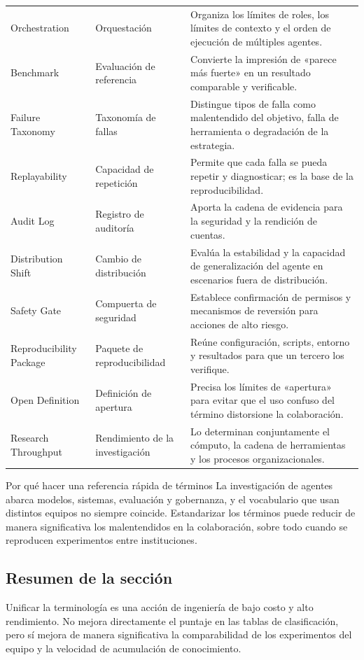 \documentclass[a4paper]{article}
\begin{document}
\begin{longtable}{p{2.7cm}p{3.2cm}p{5.6cm}}
Orchestration & Orquestación & Organiza los límites de roles, los límites de contexto y el orden de ejecución de múltiples agentes. \\
Benchmark & Evaluación de referencia & Convierte la impresión de «parece más fuerte» en un resultado comparable y verificable. \\
Failure Taxonomy & Taxonomía de fallas & Distingue tipos de falla como malentendido del objetivo, falla de herramienta o degradación de la estrategia. \\
Replayability & Capacidad de repetición & Permite que cada falla se pueda repetir y diagnosticar; es la base de la reproducibilidad. \\
Audit Log & Registro de auditoría & Aporta la cadena de evidencia para la seguridad y la rendición de cuentas. \\
Distribution Shift & Cambio de distribución & Evalúa la estabilidad y la capacidad de generalización del agente en escenarios fuera de distribución. \\
Safety Gate & Compuerta de seguridad & Establece confirmación de permisos y mecanismos de reversión para acciones de alto riesgo. \\
Reproducibility Package & Paquete de reproducibilidad & Reúne configuración, scripts, entorno y resultados para que un tercero los verifique. \\
Open Definition & Definición de apertura & Precisa los límites de «apertura» para evitar que el uso confuso del término distorsione la colaboración. \\
Research Throughput & Rendimiento de la investigación & Lo determinan conjuntamente el cómputo, la cadena de herramientas y los procesos organizacionales. \\
\bottomrule
\end{longtable}

\begin{knowledgebox}{Por qué hacer una referencia rápida de términos}
La investigación de agentes abarca modelos, sistemas, evaluación y gobernanza, y el vocabulario que usan distintos equipos no siempre coincide.
Estandarizar los términos puede reducir de manera significativa los malentendidos en la colaboración, sobre todo cuando se reproducen experimentos entre instituciones.
\end{knowledgebox}

\subsection{Resumen de la sección}
Unificar la terminología es una acción de ingeniería de bajo costo y alto rendimiento. No mejora directamente el puntaje en las tablas de clasificación, pero sí mejora de manera significativa la comparabilidad de los experimentos del equipo y la velocidad de acumulación de conocimiento.
\end{document}
